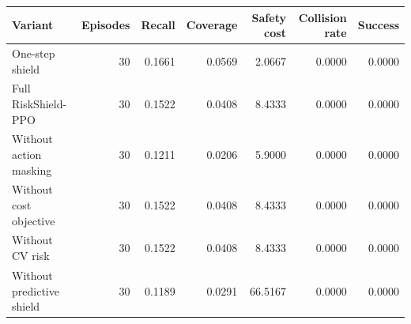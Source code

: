 \begin{tabular}{lrrrrrr}
\toprule
Variant & Episodes & Recall & Coverage & Safety cost & Collision rate & Success \\
\midrule
One-step shield & 30 & 0.1661 & 0.0569 & 2.0667 & 0.0000 & 0.0000 \\
Full RiskShield-PPO & 30 & 0.1522 & 0.0408 & 8.4333 & 0.0000 & 0.0000 \\
Without action masking & 30 & 0.1211 & 0.0206 & 5.9000 & 0.0000 & 0.0000 \\
Without cost objective & 30 & 0.1522 & 0.0408 & 8.4333 & 0.0000 & 0.0000 \\
Without CV risk & 30 & 0.1522 & 0.0408 & 8.4333 & 0.0000 & 0.0000 \\
Without predictive shield & 30 & 0.1189 & 0.0291 & 66.5167 & 0.0000 & 0.0000 \\
\bottomrule
\end{tabular}
